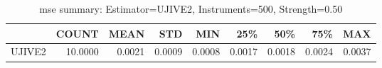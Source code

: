 \begin{table}[ht]
\centering
\caption{mse summary: Estimator=UJIVE2, Instruments=500, Strength=0.50}
\begin{tabular}{lrrrrrrrr}
\toprule
 & COUNT & MEAN & STD & MIN & 25\% & 50\% & 75\% & MAX \\
\midrule
UJIVE2 & 10.0000 & 0.0021 & 0.0009 & 0.0008 & 0.0017 & 0.0018 & 0.0024 & 0.0037 \\
\bottomrule
\end{tabular}
\end{table}
